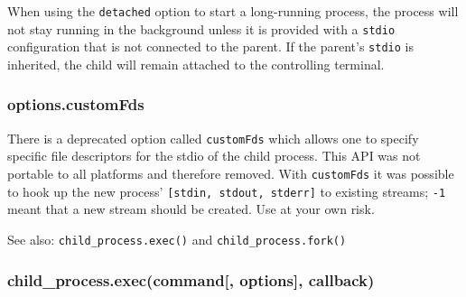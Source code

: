 \begin{Shaded}
\begin{Highlighting}[]
  \NormalTok{(}\NormalTok{),}
     \NormalTok{(}\NormalTok{,}
     \NormalTok{(}\NormalTok{, }\NormalTok{),}
     \NormalTok{(}\NormalTok{, }\NormalTok{);}

  \NormalTok{(}\NormalTok{, [], \{}
   \NormalTok{: }\NormalTok{,}
   \NormalTok{: [ }\NormalTok{, out, err ]}
 \NormalTok{\});}

 \NormalTok{();}
\end{Highlighting}
\end{Shaded}

When using the \texttt{detached} option to start a long-running process,
the process will not stay running in the background unless it is
provided with a \texttt{stdio} configuration that is not connected to
the parent. If the parent's \texttt{stdio} is inherited, the child will
remain attached to the controlling terminal.

\subsubsection{options.customFds}\label{options.customfds}

There is a deprecated option called \texttt{customFds} which allows one
to specify specific file descriptors for the stdio of the child process.
This API was not portable to all platforms and therefore removed. With
\texttt{customFds} it was possible to hook up the new process'
\texttt{{[}stdin,\ stdout,\ stderr{]}} to existing streams; \texttt{-1}
meant that a new stream should be created. Use at your own risk.

See also: \texttt{child\_process.exec()} and
\texttt{child\_process.fork()}

\subsubsection{child\_process.exec(command{[}, options{]},
callback)}\label{childux5fprocess.execcommand-options-callback}

